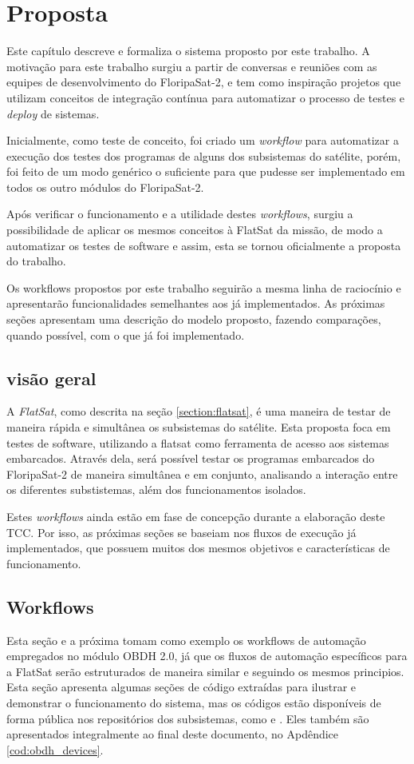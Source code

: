 \chapter{Proposta}
\label{chapter:proposta}

Este capítulo descreve e formaliza o sistema proposto por este trabalho. A motivação para este trabalho surgiu a partir de conversas e reuniões com as equipes de desenvolvimento do FloripaSat-2, e tem como inspiração projetos que utilizam conceitos de integração contínua para automatizar o processo de testes e \textit{deploy} de sistemas.

Inicialmente, como teste de conceito, foi criado um \textit{workflow} para automatizar a execução dos testes dos programas de alguns dos subsistemas do satélite, porém, foi feito de um modo genérico o suficiente para que pudesse ser implementado em todos os outro módulos do FloripaSat-2.

Após verificar o funcionamento e a utilidade destes \textit{workflows}, surgiu a possibilidade de aplicar os mesmos conceitos à FlatSat da missão, de modo a automatizar os testes de software e assim, esta se tornou oficialmente a proposta do trabalho.

Os workflows propostos por este trabalho seguirão a mesma linha de raciocínio e apresentarão funcionalidades semelhantes aos já implementados. As próximas seções apresentam uma descrição do modelo proposto, fazendo comparações, quando possível, com o que já foi implementado.


\section{visão geral}
A \textit{FlatSat}, como descrita na seção \ref{section:flatsat}, é uma maneira de testar de maneira rápida e simultânea os subsistemas do satélite. Esta proposta foca em testes de software, utilizando a flatsat como ferramenta de acesso aos sistemas embarcados. Através dela, será possível testar os programas embarcados do FloripaSat-2 de maneira simultânea e em conjunto, analisando a interação entre os diferentes substistemas, além dos funcionamentos isolados.

Estes \textit{workflows} ainda estão em fase de concepção durante a elaboração deste TCC. Por isso, as próximas seções se baseiam nos fluxos de execução já implementados, que possuem muitos dos mesmos objetivos e características de funcionamento.

\section{Workflows}
Esta seção e a próxima tomam como exemplo os workflows de automação empregados no módulo OBDH 2.0, já que os fluxos de automação específicos para a FlatSat serão estruturados de maneira similar e seguindo os mesmos principios. Esta seção apresenta algumas seções de código extraídas para ilustrar e demonstrar o funcionamento do sistema, mas os códigos estão disponíveis de forma pública nos repositórios dos subsistemas, como \cite{eps2-github} e \cite{obdh2-github}. Eles também são apresentados integralmente ao final deste documento, no Apdêndice \ref{cod:obdh_devices}.

